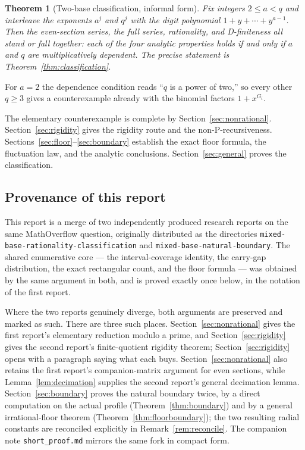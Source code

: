 \documentclass[11pt,letterpaper]{article}
\numberwithin{equation}{section}
\newtheorem{theorem}{Theorem}[section]
\theoremstyle{definition}
\theoremstyle{remark}
\begin{document}
\begin{theorem}[Two-base classification, informal form]\label{thm:classintro}
Fix integers $2\le a<q$ and interleave the exponents $a^j$ and $q^j$ with the
digit polynomial $1+y+\cdots+y^{a-1}$. Then the even-section series, the full
series, rationality, and D-finiteness all stand or fall together: each of the
four analytic properties holds if and only if $a$ and $q$ are multiplicatively
dependent. The precise statement is Theorem~\ref{thm:classification}.
\end{theorem}

For $a=2$ the dependence condition reads ``$q$ is a power of two,'' so every
other $q\ge3$ gives a counterexample already with the binomial factors
$1+x^{G_i}$.

The elementary counterexample is complete by Section~\ref{sec:nonrational}.
Section~\ref{sec:rigidity} gives the rigidity route and the
non-P-recursiveness. Sections~\ref{sec:floor}--\ref{sec:boundary} establish
the exact floor formula, the fluctuation law, and the analytic conclusions.
Section~\ref{sec:general} proves the classification.

\subsection{Provenance of this report}\label{sec:provenance}
This report is a merge of two independently produced research reports on the
same MathOverflow question, originally distributed as the directories
\texttt{mixed-base-rationality-classification} and
\texttt{mixed-base-natural-boundary}. The shared enumerative core --- the
interval-coverage identity, the carry-gap distribution, the exact rectangular
count, and the floor formula --- was obtained by the same argument in both,
and is proved exactly once below, in the notation of the first report.

Where the two reports genuinely diverge, both arguments are preserved and
marked as such. There are three such places. Section~\ref{sec:nonrational}
gives the first report's elementary reduction modulo a prime, and
Section~\ref{sec:rigidity} gives the second report's finite-quotient rigidity
theorem; Section~\ref{sec:rigidity} opens with a paragraph saying what each
buys. Section~\ref{sec:nonrational} also retains the first report's
companion-matrix argument for even sections, while
Lemma~\ref{lem:decimation} supplies the second report's general decimation
lemma. Section~\ref{sec:boundary} proves the natural boundary twice, by a
direct computation on the actual profile (Theorem~\ref{thm:boundary}) and by
a general irrational-floor theorem (Theorem~\ref{thm:floorboundary}); the two
resulting radial constants are reconciled explicitly in
Remark~\ref{rem:reconcile}. The companion note \texttt{short\_proof.md}
mirrors the same fork in compact form.
\end{document}
